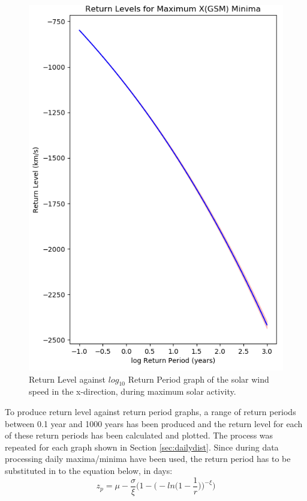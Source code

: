 \documentclass[12pt]{article}
\begin{document}
\begin{figure}[t!]
\begin{minipage}{0.48\textwidth}
                \includegraphics[width=\textwidth]{fig_method/SWEmaxXminReturn.png}
                \caption{Return Level against $log_{10}$ Return Period graph of the solar wind speed in the x-direction, during maximum solar activity.}
                \label{fig:SWEmaxXminReturn}
            \end{minipage}
        \end{figure}
        To produce return level against return period graphs, a range of return periods between 0.1 year and 1000 years has been produced and the return level for each of these return periods has been calculated and plotted. The process was repeated for each graph shown in Section \ref{sec:dailydist}.
        Since during data processing daily maxima/minima have been used, the return period has to be substituted in to the equation below, in days:
        \begin{equation}
            z_p = \mu-\frac{\sigma}{\xi}\Bigg( 1-\Bigg( -ln\Bigg( 1-\frac{1}{r}\Bigg) \Bigg) ^{-\xi}\Bigg)
        \end{equation}
\end{document}
